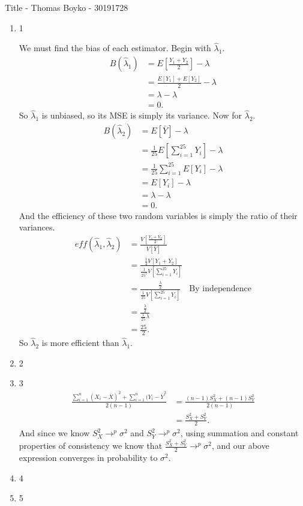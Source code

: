 \documentclass{article}
\begin{document}
    \huge Title - Thomas Boyko - 30191728
    \normalsize
\begin{enumerate} 
\item 1

    We must find the bias of each estimator. Begin with $\hat{\lambda}_1$.
    \begin{align*}
        B(\hat{\lambda}_1)&= E\left[ \frac{Y_1+Y_2}{2} \right] -\lambda \\
                         &= \frac{E[Y_1]+E[Y_2]}{2}-\lambda \\
                         &= \lambda-\lambda \\
                         &= 0
    .\end{align*}
    So $\hat{\lambda}_1$ is unbiased, so its MSE is simply its variance.
    Now for $\hat{\lambda}_2$.
    \begin{align*}
        B(\hat{\lambda}_2)&= E[\bar{Y}]-\lambda \\
                          &= \frac{1}{25}E[\sum_{i=1}^{25} Y_i]-\lambda \\
                          &= \frac{1}{25}\sum_{i=1}^{25}E[ Y_i]-\lambda \\
                          &= E[ Y_i] -\lambda\\
                          &= \lambda-\lambda\\
                          &= 0
    .\end{align*}
    And the efficiency of these two random variables is simply the ratio of their variances.
    \begin{align*}
        eff(\hat{\lambda}_1,\hat{\lambda}_2)&=\frac{V\left[ \frac{Y_1+Y_2}{2} \right] }{V[\bar{Y}]}\\
                                            & =\frac{\frac{1}{4}V\left[ Y_1+Y_2 \right] }{\frac{1}{25^2}V[\sum_{i=1}^{25}Y_i]}\\
        & =\frac{\frac{\lambda}{2} }{\frac{1}{25}V[\sum_{i=1}^{25}Y_i]}& \text{By independence}\\
        & =\frac{\frac{\lambda}{2} }{\frac{1}{25}\lambda}\\
        &= \frac{25}{2} 
    .\end{align*}
    So $\hat{\lambda}_2$ is more efficient than $\hat{\lambda}_1$.
\item 2
\item 3
    \begin{align*}
        \frac{\sum_{i =1}^{n} (X_i -\bar{X})^2+\sum_{i=1}^{n} (Y_i-\bar{Y}^2}{2(n-1)}&= 
        \frac{(n-1)S_X^2+(n-1)S_Y^2}{2(n-1)}\\
            &=\frac{S_X^2+S_Y^2}{2}
    .\end{align*}
    And since we know $S_X^2\to^p \sigma^2$ and $S_Y^2\to^p\sigma^2$, using summation and constant
    properties of consistency we know that $\frac{S_X^2+S_Y^2}{2}\to^p\sigma^2$, and our above 
    expression converges in probability to $\sigma^2$.
\item 4
\item 5 


\end{enumerate}
\end{document}
